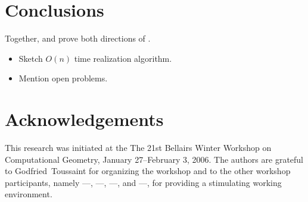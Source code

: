 \documentclass[lotsofwhite,charterfonts]{patmorin}
\begin{document}
\section{Conclusions}

Together,  and  prove both directions of
.

\begin{itemize}
\item Sketch $O(n)$ time realization algorithm.
\item Mention open problems.
\end{itemize}

\section{Acknowledgements}

This research was initiated at the The 21st Bellairs Winter Workshop
on Computational Geometry, January 27--February 3, 2006.  The authors
are grateful to Godfried~Toussaint for organizing the workshop and to
the other workshop participants, namely
---,
---,
---, and
---,
for providing a stimulating working environment.




\end{document}
